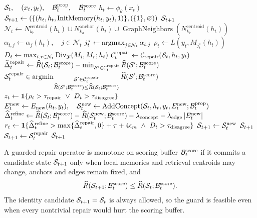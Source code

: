 \begin{algorithm}[H]
\caption{\textsc{CA-Observe}}
\label{alg:dgm-observe}
\begin{algorithmic}[1]
\Statex $\mathcal{S}_t,\quad (x_t,y_t),\quad \mathcal{B}_t^{\mathrm{prop}},\quad \mathcal{B}_t^{\mathrm{score}}$
\State $h_t\gets\phi_\theta(x_t)$
\State $\mathcal{S}_{t+1}\gets(\{(h_t,h_t,\operatorname{InitMemory}(h_t,y_t),1)\},(\{1\},\varnothing))$
\State \Return $\mathcal{S}_{t+1}$
\EndIf
\State $\mathcal N_t\gets N_{k_c}^{\mathrm{centroid}}(h_t)\cup N_{k_a}^{\mathrm{anchor}}(h_t)\cup\operatorname{GraphNeighbors}(N_{k_c}^{\mathrm{centroid}}(h_t))$
\State $\alpha_{t,j}\gets\alpha_j(h_t),\quad j\in \mathcal N_t$
\State $j_t^\star\gets\operatorname*{argmax}_{j\in \mathcal N_t}\alpha_{t,j}$
\State $\rho_t\gets L(y_t,M_{j_t^\star}(h_t))$
\State $D_t\gets\max_{i,r\in \mathcal N_t}\operatorname{Div}_{\mathcal{Y}}(M_i,M_r;h_t)$
\State $\mathcal{C}_t^{\mathrm{repair}}\gets\mathcal{C}_{\mathrm{repair}}(\mathcal{S}_t,h_t,y_t)$
\State $\widehat\Delta_t^{\mathrm{repair}}\gets
\widehat R(\mathcal{S}_t;\mathcal{B}_t^{\mathrm{score}})
-\min_{\mathcal{S}'\in\mathcal{C}_t^{\mathrm{repair}}}
\widehat R(\mathcal{S}';\mathcal{B}_t^{\mathrm{score}})$
\State $\mathcal{S}_t^{\mathrm{repair}}\in
\operatorname*{argmin}_{\substack{\mathcal{S}'\in\mathcal{C}_t^{\mathrm{repair}}\\
\widehat R(\mathcal{S}';\mathcal{B}_t^{\mathrm{score}})
\le \widehat R(\mathcal{S}_t;\mathcal{B}_t^{\mathrm{score}})}}
\widehat R(\mathcal{S}';\mathcal{B}_t^{\mathrm{score}})$
\State $z_t\gets\one\{\rho_t>\tau_{\mathrm{repair}}\ \vee\ D_t>\tau_{\mathrm{disagree}}\}$
\State $E_t^{\mathrm{new}}\gets E_{\mathrm{new}}(h_t,y_t),\quad \mathcal{S}_t^{\mathrm{new}}\gets\operatorname{AddConcept}(\mathcal{S}_t,h_t,y_t,E_t^{\mathrm{new}};\mathcal{B}_t^{\mathrm{prop}})$
\State $\widehat\Delta_t^{\mathrm{refine}}\gets
\widehat R(\mathcal{S}_t;\mathcal{B}_t^{\mathrm{score}})
-\widehat R(\mathcal{S}_t^{\mathrm{new}};\mathcal{B}_t^{\mathrm{score}})
-\lambda_{\mathrm{concept}}
-\lambda_{\mathrm{edge}}\left\lvert E_t^{\mathrm{new}}\right\rvert$
\State $r_t\gets
\mathbf{1}\{\widehat\Delta_t^{\mathrm{refine}}>
\max\{\widehat\Delta_t^{\mathrm{repair}},0\}+\tau+4\epsilon_m
\ \wedge\ D_t>\tau_{\mathrm{disagree}}\}$
\State $\mathcal{S}_{t+1}\gets\mathcal{S}_t^{\mathrm{new}}$
\State \Return $\mathcal{S}_{t+1}$
\EndIf
\EndIf
\State $\mathcal{S}_{t+1}\gets\mathcal{S}_t^{\mathrm{repair}}$
\State \Return $\mathcal{S}_{t+1}$
\end{algorithmic}
\end{algorithm}

\begin{definition}
\label{def:monotone-repair}
A guarded repair operator is monotone on scoring buffer $\mathcal{B}_t^{\mathrm{score}}$ if it commits a candidate state $\mathcal{S}_{t+1}$ only when local memories and retrieval centroids may change, anchors and edges remain fixed, and
\begin{align*}
\widehat R(\mathcal{S}_{t+1};\mathcal{B}_t^{\mathrm{score}})
\le
\widehat R(\mathcal{S}_t;\mathcal{B}_t^{\mathrm{score}}).
\end{align*}
The identity candidate $\mathcal{S}_{t+1}=\mathcal{S}_t$ is always allowed, so the guard is feasible even when every nontrivial repair would hurt the scoring buffer.
\end{definition}

